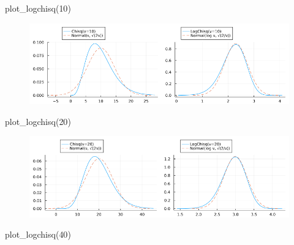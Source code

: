\documentclass[
  letterpaper,
  DIV=11,
  numbers=noendperiod]{scrartcl}
\newenvironment{Shaded}{\begin{snugshade}}{\end{snugshade}}
\newcommand{\FloatTok}[1]{\textcolor[rgb]{0.68,0.00,0.00}{#1}}
\newcommand{\FunctionTok}[1]{\textcolor[rgb]{0.28,0.35,0.67}{#1}}
\newcommand{\NormalTok}[1]{\textcolor[rgb]{0.00,0.23,0.31}{#1}}
\begin{document}
\begin{Shaded}
\begin{Highlighting}[]
\FunctionTok{plot\_logchisq}\NormalTok{(}\FloatTok{10}\NormalTok{)}
\end{Highlighting}
\end{Shaded}

\begin{figure}[H]

{\centering \includegraphics{05 Central limit theorem_files/figure-pdf/cell-105-output-1.png}

}

\end{figure}

\begin{Shaded}
\begin{Highlighting}[]
\FunctionTok{plot\_logchisq}\NormalTok{(}\FloatTok{20}\NormalTok{)}
\end{Highlighting}
\end{Shaded}

\begin{figure}[H]

{\centering \includegraphics{05 Central limit theorem_files/figure-pdf/cell-106-output-1.png}

}

\end{figure}

\begin{Shaded}
\begin{Highlighting}[]
\FunctionTok{plot\_logchisq}\NormalTok{(}\FloatTok{40}\NormalTok{)}
\end{Highlighting}
\end{Shaded}
\end{document}
